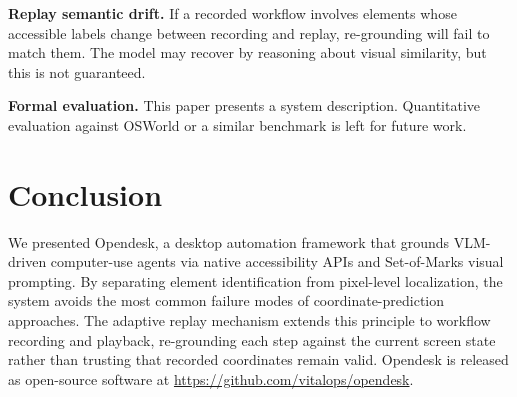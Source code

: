 \documentclass[11pt]{article}
\begin{document}
\textbf{Replay semantic drift.} If a recorded workflow involves elements whose accessible labels change between recording and replay, re-grounding will fail to match them. The model may recover by reasoning about visual similarity, but this is not guaranteed.

\textbf{Formal evaluation.} This paper presents a system description. Quantitative evaluation against OSWorld \cite{osworld} or a similar benchmark is left for future work.

\section{Conclusion}

We presented Opendesk, a desktop automation framework that grounds VLM-driven computer-use agents via native accessibility APIs and Set-of-Marks visual prompting. By separating element identification from pixel-level localization, the system avoids the most common failure modes of coordinate-prediction approaches. The adaptive replay mechanism extends this principle to workflow recording and playback, re-grounding each step against the current screen state rather than trusting that recorded coordinates remain valid. Opendesk is released as open-source software at \url{https://github.com/vitalops/opendesk}.



\end{document}
